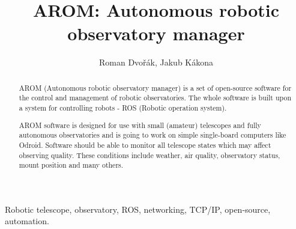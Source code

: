 \documentclass{ibws_template}
\begin{document}

%
\title{AROM: Autonomous robotic observatory manager}
%

%
\author{Roman Dvořák, Jakub Kákona }
%


\maketitle


\begin{abstract}
AROM (Autonomous robotic observatory manager) is a set of open-source software for the control and management of robotic observatories. The whole software is built upon a system for controlling robots - ROS (Robotic operation system).

AROM software is designed for use with small (amateur) telescopes and fully autonomous observatories and is going to work on simple single-board computers like Odroid. Software should be able to monitor all telescope states which may affect observing quality. These conditions include weather, air quality, observatory status, mount position and many others.
\end{abstract}


\begin{keywords}
Robotic telescope, observatory, ROS, networking, TCP/IP, open-source, automation.
\end{keywords}
\end{document}
